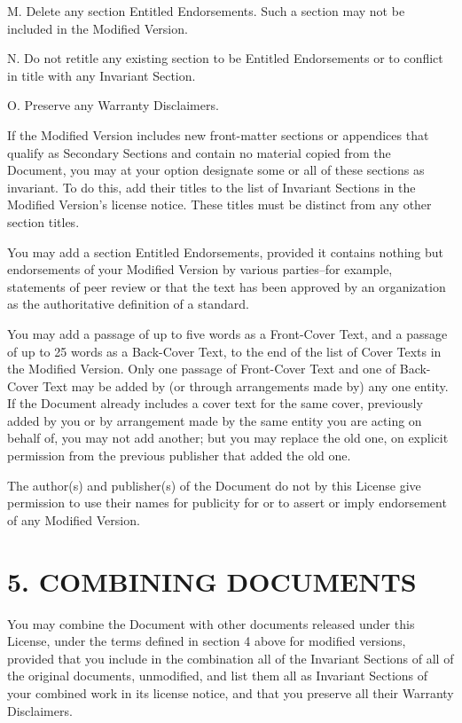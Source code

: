 \documentclass[captions=tableheading]{scrbook}
\begin{document}
M. Delete any section Entitled Endorsements. Such a section may not be included in the Modified Version. 

N. Do not retitle any existing section to be Entitled Endorsements or to conflict in title with any Invariant Section. 

O. Preserve any Warranty Disclaimers.

If the Modified Version includes new front-matter sections or appendices that qualify as Secondary Sections and contain no material copied from the Document, you may at your option designate some or all of these sections as invariant. To do this, add their titles to the list of Invariant Sections in the Modified Version's license notice. These titles must be distinct from any other section titles.

You may add a section Entitled Endorsements, provided it contains nothing but endorsements of your Modified Version by various parties--for example, statements of peer review or that the text has been approved by an organization as the authoritative definition of a standard.

You may add a passage of up to five words as a Front-Cover Text, and a passage of up to 25 words as a Back-Cover Text, to the end of the list of Cover Texts in the Modified Version. Only one passage of Front-Cover Text and one of Back-Cover Text may be added by (or through arrangements made by) any one entity. If the Document already includes a cover text for the same cover, previously added by you or by arrangement made by the same entity you are acting on behalf of, you may not add another; but you may replace the old one, on explicit permission from the previous publisher that added the old one.

The author(s) and publisher(s) of the Document do not by this License give permission to use their names for publicity for or to assert or imply endorsement of any Modified Version.
\section{5. COMBINING DOCUMENTS}
\label{sec-3-6}


You may combine the Document with other documents released under this License, under the terms defined in section 4 above for modified versions, provided that you include in the combination all of the Invariant Sections of all of the original documents, unmodified, and list them all as Invariant Sections of your combined work in its license notice, and that you preserve all their Warranty Disclaimers.
\end{document}
